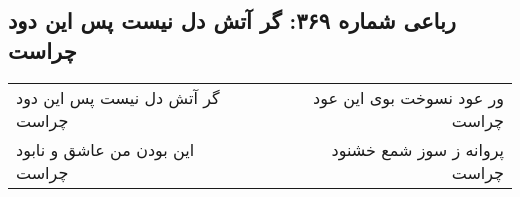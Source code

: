 \begin{center}
\section*{رباعی شماره ۳۶۹: گر آتش دل نیست پس این دود چراست}
\label{sec:0369}
\begin{longtable}{l p{0.5cm} r}
گر آتش دل نیست پس این دود چراست
&&
ور عود نسوخت بوی این عود چراست
\\
این بودن من عاشق و نابود چراست
&&
پروانه ز سوز شمع خشنود چراست
\\
\end{longtable}
\end{center}
